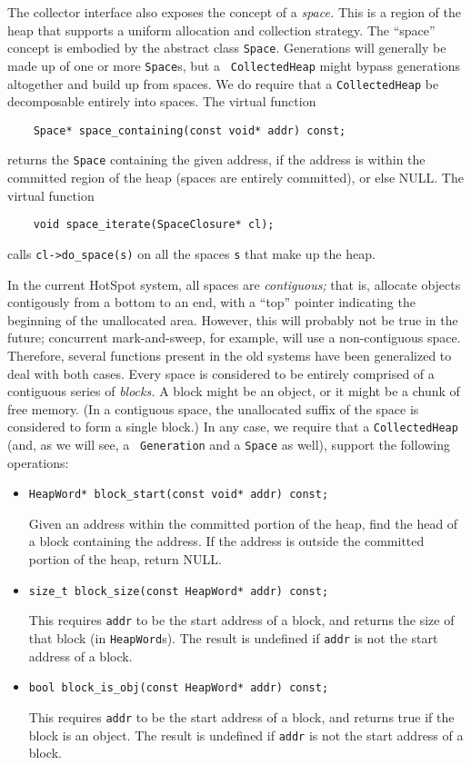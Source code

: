 \documentclass{article}
\begin{document}
The collector interface also exposes the concept of a {\em space.}
This is a region of the heap that supports a uniform allocation and
collection strategy.  The ``space'' concept is
embodied by the abstract class {\tt Space}.  Generations will
generally be made up of one or more {\tt Space}s, but a {\tt
CollectedHeap} might bypass generations altogether and build up from
spaces.  We do require that a {\tt CollectedHeap} be
decomposable entirely into spaces.  The virtual function
\begin{verbatim}
    Space* space_containing(const void* addr) const;
\end{verbatim}
returns the {\tt Space} containing the given address, if the address
is within the committed region of the heap (spaces are entirely
committed), or else NULL.  The virtual function
\begin{verbatim}
    void space_iterate(SpaceClosure* cl);
\end{verbatim}
calls {\tt cl->do\_space(s)} on all the spaces {\tt s} that make up the
heap.

In the current HotSpot system, all spaces are {\it contiguous;} that
is, allocate objects contigously from a bottom to an end, with a
``top'' pointer indicating the beginning of the unallocated area.
However, this will probably not be true in the future; concurrent
mark-and-sweep, for example, will use a non-contiguous space.
Therefore, several functions present in the old systems have been
generalized to deal with both cases.  Every space is considered to be
entirely comprised of a contiguous series of {\em blocks.}  A block
might be an object, or it might be a chunk of free memory.  (In a
contiguous space, the unallocated suffix of the space is considered to
form a single block.)  In any case, we 
require that a {\tt CollectedHeap} (and, as we will see, a {\tt
Generation} and a {\tt Space} as well), support the following
operations:
\begin{itemize}
\item {\tt HeapWord* block\_start(const void* addr) const;}

Given an address within the committed portion of the heap, find the
head of a block containing the address.  If the address is outside the
committed portion of the heap, return NULL.

\item {\tt size\_t block\_size(const HeapWord* addr) const;}

This requires {\tt addr} to be the start address of a block, and
returns the size of that block (in {\tt HeapWord}s).  The result is
undefined if {\tt addr} is not the start address of a block.

\item {\tt bool block\_is\_obj(const HeapWord* addr) const;}

This requires {\tt addr} to be the start address of a block, and
returns true if the block is an object.  The result is
undefined if {\tt addr} is not the start address of a block.

\end{itemize}
\end{document}
